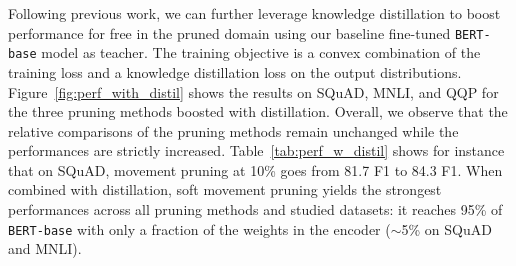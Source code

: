 \documentclass{article}
\begin{document}
\begin{table}
  \caption{Distillation-augmented performances for selected high sparsity levels. \textbf{All pruning methods benefit from distillation signal further enhancing the ratio Performance VS Model Size.}}
  \label{tab:perf_w_distil}
  \centering
\end{table}

Following previous work, we can further leverage knowledge distillation \citep{Bucila2006ModelC,Hinton2015DistillingTK} to boost performance for free in the pruned domain \citep{Jiao2019TinyBERTDB,Sanh2019DistilBERTAD} using our baseline fine-tuned \texttt{BERT-base} model as teacher. The training objective is a convex combination of the training loss and a knowledge distillation loss on the output distributions. Figure~\ref{fig:perf_with_distil} shows the results on SQuAD, MNLI, and QQP for the three pruning methods boosted with distillation. Overall, we observe that the relative comparisons of the pruning methods remain unchanged while the performances are strictly increased. Table~\ref{tab:perf_w_distil} shows for instance that on SQuAD, movement pruning at 10\% goes from 81.7 F1 to 84.3 F1. When combined with distillation, soft movement pruning yields the strongest performances across all pruning methods and studied datasets: it reaches 95\% of \texttt{BERT-base} with only a fraction of the weights in the encoder ($\sim$5\% on SQuAD and MNLI).
\end{document}
